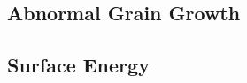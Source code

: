 %
%

\subsection{Abnormal Grain Growth}\label{abnormal-grain-growth}



\subsection{Surface Energy}\label{surface-energy}


